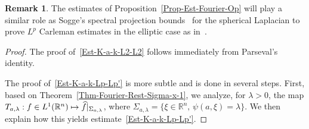 \documentclass[10pt]{amsart}
\theoremstyle{definition}\newtheorem{defi}[theo]{Definition}\newtheorem{rema}[theo]{Remark}\newtheorem{exam}[theo]{Example}\newtheorem{exem}[theo]{Example}\newtheorem{nota}[theo]{Notation}
\newcommand*\R{\mathbb{R}}
\renewcommand{\hat}{\widehat}
\let\oldhat\hat
\renewcommand*{\hat}[1]{\mathchoice{\widehat{#1}}{\widehat{#1}}{\oldhat{#1}}{\oldhat{#1}}}
\begin{document}
\begin{rema}
The estimates of Proposition~\ref{Prop-Est-Fourier-Op} will play a similar role as Sogge's spectral projection bounds~\cite{sogge1988concerning} for the spherical Laplacian to prove $L^p$ Carleman estimates in the elliptic case as in~\cite{jerison1986carleman, Sogge.Strong.Elliptic1990,koch2001carleman}.
\end{rema}

\begin{proof}
The proof of~\eqref{Est-K-a-k-L2-L2} follows immediately from Parseval's identity.

The proof of~\eqref{Est-K-a-k-Lp-Lp'} is more subtle and is done in several steps. First, based on Theorem~\ref{Thm-Fourier-Rest-Sigma-x-1}, we analyze, for $\lambda>0$, the map $T_{a,\lambda}: f \in L^1(\R^n) \mapsto \hat f|_{\Sigma_{a,\lambda}}$, where $\Sigma_{a,\lambda} = \{ \xi \in \R^n, \, \psi(a, \xi) = \lambda\}$. We then explain how this yields estimate~\eqref{Est-K-a-k-Lp-Lp'}.


\end{proof}
\end{document}
